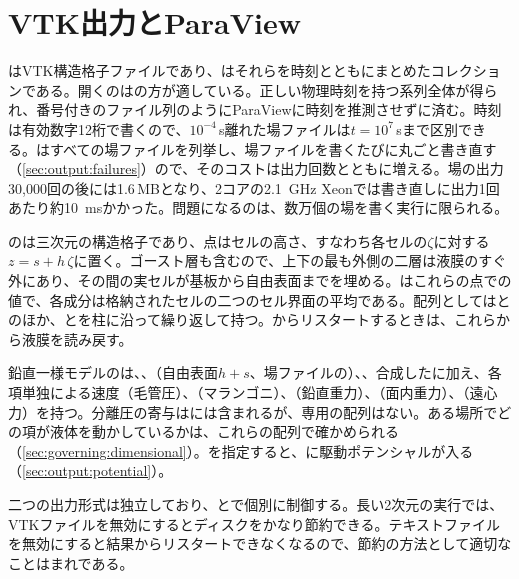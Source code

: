 \section{VTK出力とParaView}
\label{sec:output:vtk}

はVTK構造格子ファイルであり、はそれらを時刻とともにまとめたコレクションである。開くのはの方が適している。正しい物理時刻を持つ系列全体が得られ、番号付きのファイル列のようにParaViewに時刻を推測させずに済む。時刻は有効数字12桁で書くので、$10^{-4}$\,s離れた場ファイルは$t = 10^{7}$\,sまで区別できる。はすべての場ファイルを列挙し、場ファイルを書くたびに丸ごと書き直す（\cref{sec:output:failures}）ので、そのコストは出力回数とともに増える。場の出力30{,}000回の後には1.6\,MBとなり、2コアの\SI{2.1}{\giga\hertz} Xeonでは書き直しに出力1回あたり約\SI{10}{\milli\second}かかった。問題になるのは、数万個の場を書く実行に限られる。

のは三次元の構造格子であり、点はセルの高さ、すなわち各セルの$\zeta$に対する$z = s + h\,\zeta$に置く。ゴースト層も含むので、上下の最も外側の二層は液膜のすぐ外にあり、その間の実セルが基板から自由表面までを埋める。はこれらの点での値で、各成分は格納されたセルの二つのセル界面の平均である。配列としてはとのほか、とを柱に沿って繰り返して持つ。からリスタートするときは、これらから液膜を読み戻す。

鉛直一様モデルのは、、（自由表面$h+s$、場ファイルの）、、合成したに加え、各項単独による速度（毛管圧）、（マランゴニ）、（鉛直重力）、（面内重力）、（遠心力）を持つ。分離圧の寄与はには含まれるが、専用の配列はない。ある場所でどの項が液体を動かしているかは、これらの配列で確かめられる（\cref{sec:governing:dimensional}）。を指定すると、に駆動ポテンシャルが入る（\cref{sec:output:potential}）。

二つの出力形式は独立しており、とで個別に制御する。長い2次元の実行では、VTKファイルを無効にするとディスクをかなり節約できる。テキストファイルを無効にすると結果からリスタートできなくなるので、節約の方法として適切なことはまれである。

